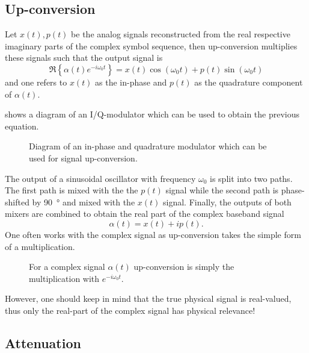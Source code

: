 \subsection{Up-conversion}

Let $x(t),p(t)$ be the analog signals reconstructed from the real respective imaginary parts of the complex symbol sequence, then up-conversion multiplies these signals such that the output signal is~\cite[p.~25]{Madhow2008}
\begin{equation}
	\Re\left\{
		\alpha(t)
		e^{-i\omega_0t}
	\right\}
	=
	x(t)
	\cos(\omega_0t)
	+
	p(t)
	\sin(\omega_0t)
\end{equation}
and one refers to $x(t)$ as the in-phase and $p(t)$ as the quadrature component of $\alpha(t)$.

 shows a diagram of an I/Q-modulator which can be used to obtain the previous equation.
\begin{figure}[htb]
	\centering
	
	\caption{Diagram of an in-phase and quadrature modulator which can be used for signal up-conversion.}\label{fig:iqmod}
\end{figure}
The output of a sinusoidal oscillator with frequency $\omega_0$ is split into two paths.
The first path is mixed with the the $p(t)$ signal while the second path is phase-shifted by \SI{90}{\degree} and mixed with the $x(t)$ signal.
Finally, the outputs of both mixers are combined to obtain the real part of the complex baseband signal
\begin{equation}
	\alpha(t)
	=
	x(t)
	+
	ip(t)
	.
\end{equation}
One often works with the complex signal as up-conversion takes the simple form of a multiplication.
\begin{figure}[htb]
	\centering
	
	\caption{For a complex signal $\alpha(t)$ up-conversion is simply the multiplication with $e^{-i\omega_0t}$.}
\end{figure}
However, one should keep in mind that the true physical signal is real-valued, thus only the real-part of the complex signal has physical relevance!

\subsection{Attenuation}
